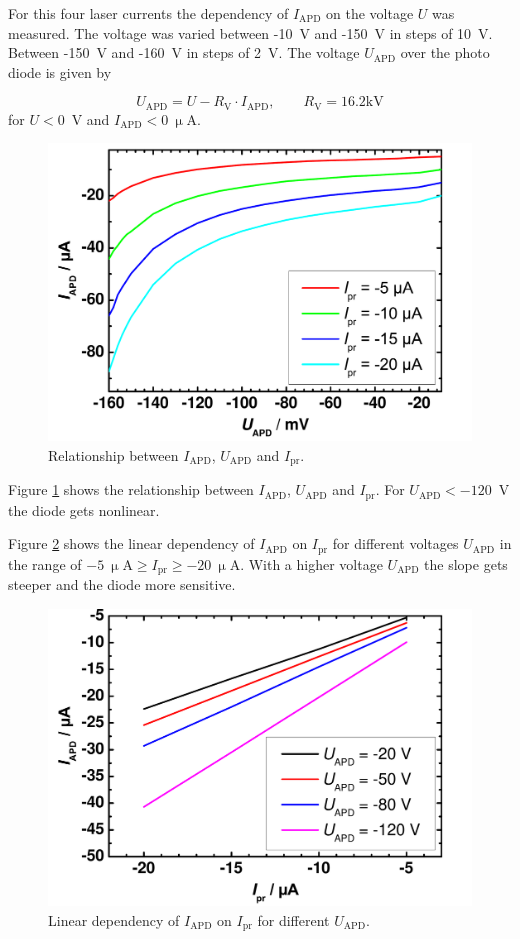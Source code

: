 For this four laser currents the dependency of $I_{\mathrm{APD}}$ on the voltage $U$ was measured. The voltage was varied between -10~V and -150~V in steps of 10~V. Between -150~V and -160~V in steps of 2~V. The voltage $U_{\mathrm{APD}}$ over the photo diode is given by 

\begin{equation}
U_{\mathrm{APD}} = U - R_{\mathrm{V}}\cdot I_{\mathrm{APD}}, \qquad  R_{\mathrm{V}} = 16.2 \mathrm{kV}
\label{eq:}
\end{equation}
for $U < 0$~V and $I_{\mathrm{APD}} < 0~\upmu$A.

\begin{figure}%
\centering
\includegraphics[width=.5\columnwidth]{Grafiken/T3_1.pdf}%
\caption{Relationship between  $I_{\mathrm{APD}}$,  $U_{\mathrm{APD}}$ and  $I_{\mathrm{pr}}$. }%
\label{fig:T3_1}%
\end{figure}

Figure \ref{fig:T3_1} shows the relationship between $I_{\mathrm{APD}}$,  $U_{\mathrm{APD}}$ and  $I_{\mathrm{pr}}$.
For $U_{\mathrm{APD}} < -120$~V the diode gets nonlinear. 

Figure \ref{fig:T3_2} shows the linear dependency of $I_{\mathrm{APD}}$ on $I_{\mathrm{pr}}$ for different voltages $U_{\mathrm{APD}}$ in the range of $-5~\upmu\mathrm{A} \geq I_{\mathrm{pr}} \geq - 20~\upmu\mathrm{A}$. With a higher voltage $U_{\mathrm{APD}}$ the slope gets steeper and the diode more sensitive.

\begin{figure}%
\centering
\includegraphics[width=.5\columnwidth]{Grafiken/T3_2.pdf}%
\caption{Linear dependency of $I_{\mathrm{APD}}$ on $I_{\mathrm{pr}}$ for different $U_{\mathrm{APD}}$.}%
\label{fig:T3_2}%
\end{figure}

